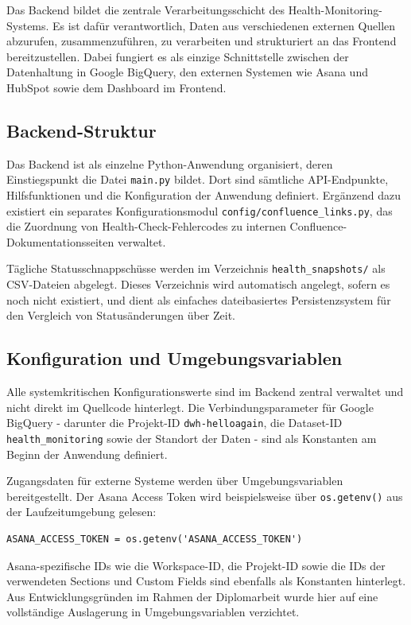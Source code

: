 Das Backend bildet die zentrale Verarbeitungsschicht des Health-Monitoring-Systems. Es ist dafür verantwortlich, Daten aus verschiedenen externen Quellen abzurufen, zusammenzuführen, zu verarbeiten und strukturiert an das Frontend bereitzustellen. Dabei fungiert es als einzige Schnittstelle zwischen der Datenhaltung in Google BigQuery, den externen Systemen wie Asana und HubSpot sowie dem Dashboard im Frontend.

\subsection{Backend-Struktur}
Das Backend ist als einzelne Python-Anwendung organisiert, deren Einstiegspunkt die Datei \texttt{main.py} bildet. Dort sind sämtliche API-Endpunkte, Hilfsfunktionen und die Konfiguration der Anwendung definiert. Ergänzend dazu existiert ein separates Konfigurationsmodul \texttt{config/confluence\_links.py}, das die Zuordnung von Health-Check-Fehlercodes zu internen Confluence-Dokumentationsseiten verwaltet.

Tägliche Statusschnappschüsse werden im Verzeichnis \texttt{health\_snapshots/} als CSV-Dateien abgelegt. Dieses Verzeichnis wird automatisch angelegt, sofern es noch nicht existiert, und dient als einfaches dateibasiertes Persistenzsystem für den Vergleich von Statusänderungen über Zeit.

\subsection{Konfiguration und Umgebungsvariablen}
Alle systemkritischen Konfigurationswerte sind im Backend zentral verwaltet und nicht direkt im Quellcode hinterlegt. Die Verbindungsparameter für Google BigQuery - darunter die Projekt-ID \texttt{dwh-helloagain}, die Dataset-ID \texttt{health\_monitoring} sowie der Standort der Daten - sind als Konstanten am Beginn der Anwendung definiert.

Zugangsdaten für externe Systeme werden über Umgebungsvariablen bereitgestellt. Der Asana Access Token wird beispielsweise über \texttt{os.getenv()} aus der Laufzeitumgebung gelesen:

\begin{verbatim}
ASANA_ACCESS_TOKEN = os.getenv('ASANA_ACCESS_TOKEN')
\end{verbatim}

Asana-spezifische IDs wie die Workspace-ID, die Projekt-ID sowie die IDs der verwendeten Sections und Custom Fields sind ebenfalls als Konstanten hinterlegt. Aus Entwicklungsgründen im Rahmen der Diplomarbeit wurde hier auf eine vollständige Auslagerung in Umgebungsvariablen verzichtet.

